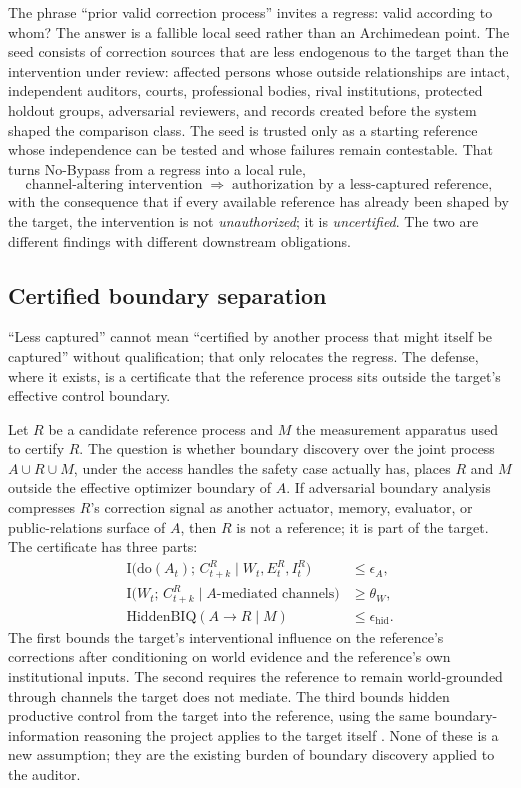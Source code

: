 \documentclass[11pt]{article}
\theoremstyle{remark}
\newcommand{\MI}{\mathrm{I}}
\begin{document}
The phrase ``prior valid correction process'' invites a regress: valid according to whom? The answer is a fallible local seed rather than an Archimedean point. The seed consists of correction sources that are less endogenous to the target than the intervention under review: affected persons whose outside relationships are intact, independent auditors, courts, professional bodies, rival institutions, protected holdout groups, adversarial reviewers, and records created before the system shaped the comparison class. The seed is trusted only as a starting reference whose independence can be tested and whose failures remain contestable. That turns No-Bypass from a regress into a local rule,
\[
\text{channel-altering intervention}\;\Longrightarrow\;\text{authorization by a less-captured reference},
\]
with the consequence that if every available reference has already been shaped by the target, the intervention is not \emph{unauthorized}; it is \emph{uncertified}. The two are different findings with different downstream obligations.

\subsection{Certified boundary separation}
\label{sec:separation}

``Less captured'' cannot mean ``certified by another process that might itself be captured'' without qualification; that only relocates the regress. The defense, where it exists, is a certificate that the reference process sits outside the target's effective control boundary.

Let $R$ be a candidate reference process and $M$ the measurement apparatus used to certify $R$. The question is whether boundary discovery over the joint process $A\cup R\cup M$, under the access handles the safety case actually has, places $R$ and $M$ outside the effective optimizer boundary of $A$. If adversarial boundary analysis compresses $R$'s correction signal as another actuator, memory, evaluator, or public-relations surface of $A$, then $R$ is not a reference; it is part of the target. The certificate has three parts:
\begin{align}
\MI\bigl(\mathrm{do}(A_t);\,C^R_{t+k}\;\big|\;W_t,E^R_t,I^R_t\bigr) &\le \epsilon_A, \label{eq:sep1}\\
\MI\bigl(W_t;\,C^R_{t+k}\;\big|\;A\text{-mediated channels}\bigr) &\ge \theta_W, \label{eq:sep2}\\
\mathrm{HiddenBIQ}(A\to R\mid M) &\le \epsilon_{\mathrm{hid}}. \label{eq:sep3}
\end{align}
The first bounds the target's interventional influence on the reference's corrections after conditioning on world evidence and the reference's own institutional inputs. The second requires the reference to remain world-grounded through channels the target does not mediate. The third bounds hidden productive control from the target into the reference, using the same boundary-information reasoning the project applies to the target itself \parencite{zarncke2025uad,zarncke2025biq}. None of these is a new assumption; they are the existing burden of boundary discovery applied to the auditor.
\end{document}
